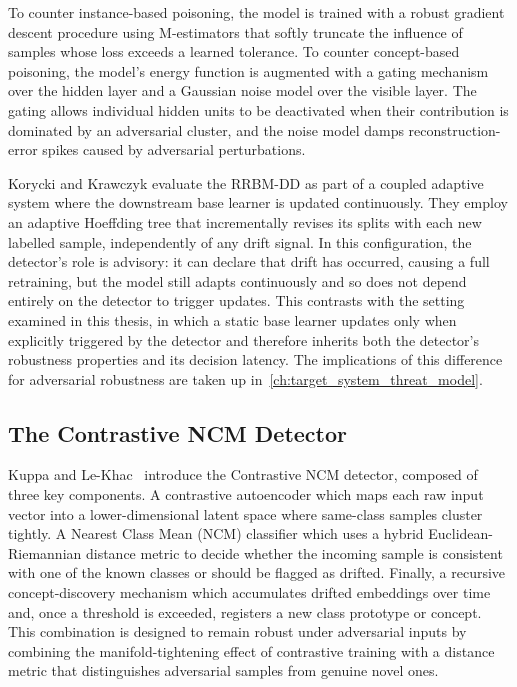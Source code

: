 To counter instance-based poisoning, the model is trained with a robust gradient descent procedure using M-estimators that softly truncate the influence of samples whose loss exceeds a learned tolerance. To counter concept-based poisoning, the model's energy function is augmented with a gating mechanism over the hidden layer and a Gaussian noise model over the visible layer. The gating allows individual hidden units to be deactivated when their contribution is dominated by an adversarial cluster, and the noise model damps reconstruction-error spikes caused by adversarial perturbations.

Korycki and Krawczyk evaluate the RRBM-DD as part of a coupled adaptive system where the downstream base learner is updated continuously. They employ an adaptive Hoeffding tree that incrementally revises its splits with each new labelled sample, independently of any drift signal. In this configuration, the detector's role is advisory: it can declare that drift has occurred, causing a full retraining, but the model still adapts continuously and so does not depend entirely on the detector to trigger updates. This contrasts with the setting examined in this thesis, in which a static base learner updates only when explicitly triggered by the detector and therefore inherits both the detector's robustness properties and its decision latency. The implications of this difference for adversarial robustness are taken up in~\cref{ch:target_system_threat_model}.

\subsection{The Contrastive NCM Detector}
\label{sec:contrastive_ncm}

Kuppa and Le-Khac~\cite{Kuppa_2022} introduce the Contrastive NCM detector, composed of three key components. A contrastive autoencoder which maps each raw input vector into a lower-dimensional latent space where same-class samples cluster tightly. A Nearest Class Mean (NCM) classifier which uses a hybrid Euclidean-Riemannian distance metric to decide whether the incoming sample is consistent with one of the known classes or should be flagged as drifted. Finally, a recursive concept-discovery mechanism which accumulates drifted embeddings over time and, once a threshold is exceeded, registers a new class prototype or concept. This combination is designed to remain robust under adversarial inputs by combining the manifold-tightening effect of contrastive training with a distance metric that distinguishes adversarial samples from genuine novel ones.

